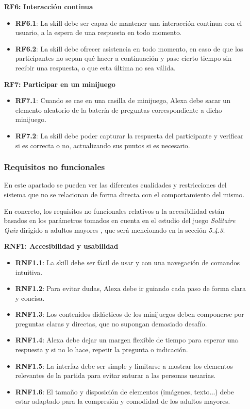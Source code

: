 \textbf{RF6: Interacción continua}
\begin{itemize}
	\item \textbf{RF6.1}: La skill debe ser capaz de mantener una interacción continua con el usuario, a la espera de una respuesta en todo momento.
    \item \textbf{RF6.2}: La skill debe ofrecer asistencia en todo momento, en caso de que los participantes no sepan qué hacer a continuación y pase cierto tiempo sin recibir una respuesta, o que esta última no sea válida.
\end{itemize}

\textbf{RF7: Participar en un minijuego}
\begin{itemize}
	\item \textbf{RF7.1}: Cuando se cae en una casilla de minijuego, Alexa debe sacar un elemento aleatorio de la batería de preguntas correspondiente a dicho minijuego.
	\item \textbf{RF7.2}: La skill debe poder capturar la respuesta del participante y verificar si es correcta o no, actualizando sus puntos si es necesario.
\end{itemize}

\subsubsection{Requisitos no funcionales}

En este apartado se pueden ver las diferentes cualidades y restricciones del sistema que no se relacionan de forma directa con el comportamiento del mismo. 

En concreto, los requisitos no funcionales relativos a la accesibilidad están basados en los parámetros tomados en cuenta en el estudio del juego \textit{Solitaire Quiz} dirigido a adultos mayores \parencite{diseño2017}, que será mencionado en la sección \textit{5.4.3}.
\vspace{0.5cm}

\textbf{RNF1: Accesibilidad y usabilidad}
\begin{itemize}
    \item \textbf{RNF1.1}: La skill debe ser fácil de usar y con una navegación de comandos intuitiva.
    \item \textbf{RNF1.2}: Para evitar dudas, Alexa debe ir guiando cada paso de forma clara y concisa.
    \item \textbf{RNF1.3}: Los contenidos didácticos de los minijuegos deben componerse por preguntas claras y directas, que no supongan demasiado desafío.
    \item \textbf{RNF1.4}: Alexa debe dejar un margen flexible de tiempo para esperar una respuesta y si no lo hace, repetir la pregunta o indicación.
    \item \textbf{RNF1.5}: La interfaz debe ser simple y limitarse a mostrar los elementos relevantes de la partida para evitar saturar a las personas usuarias.
    \item \textbf{RNF1.6}: El tamaño y disposición de elementos (imágenes, texto...) debe estar adaptado para la compresión y comodidad de los adultos mayores.
\end{itemize}

